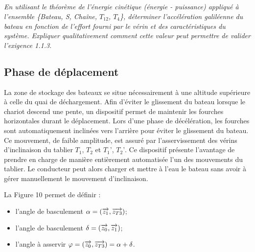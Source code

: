 \documentclass[10pt,fleqn]{article} %
\begin{document}
\subparagraph{}
\textit{En utilisant le théorème de l'énergie cinétique (énergie - puissance) appliqué à l'ensemble \{Bateau, S, Chaîne, $T_{12}$, $T_4$\}, déterminer l’accélération galiléenne du bateau en fonction de l’effort fourni par le vérin et des caractéristiques du système. Expliquer qualitativement comment cette valeur peut permettre de valider l'exigence 1.1.3.}

\subsection{Phase de déplacement}
La zone de stockage des bateaux se situe nécessairement à une altitude supérieure à celle du quai de déchargement. Afin d’éviter le glissement du bateau lorsque le chariot descend une pente, un dispositif permet de maintenir les fourches horizontales durant le déplacement. Lors d’une phase de décélération, les fourches sont automatiquement inclinées vers l’arrière pour éviter le glissement du bateau. Ce mouvement, de faible amplitude, est assuré par l’asservissement des vérins d’inclinaison du tablier $T_1$, $T_2$ et $T_1’$, $T_2’$. Ce dispositif présente l’avantage de prendre en charge de manière entièrement automatisée l’un des mouvements du tablier. Le conducteur peut alors charger et mettre à l’eau le bateau sans avoir à gérer manuellement le mouvement d’inclinaison.

La Figure 10 permet de définir :
\begin{itemize}
\item l'angle de basculement $\alpha=\left(\overrightarrow{z_1},\overrightarrow{z_{T3}}\right)$;
\item l'angle de basculement $\delta=\left(\overrightarrow{z_0},\overrightarrow{z_{1}}\right)$;
\item l'angle à asservir $\varphi=\left(\overrightarrow{z_0},\overrightarrow{z_{T3}}\right) = \alpha + \delta$.
\end{itemize}
\end{document}
